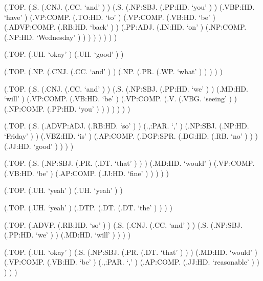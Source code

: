 \documentclass[10pt]{article}
\begin{document}
\begin{parsetree}  (.TOP. (.S. (.CNJ. (.CC. `and' ) ) (.S. (.NP:SBJ. (.PP:HD. `you' ) ) (.VBP:HD. `have' ) (.VP:COMP. (.TO:HD. `to' ) (.VP:COMP. (.VB:HD. `be' ) (.ADVP:COMP. (.RB:HD. `back' ) ) (.PP:ADJ. (.IN:HD. `on' ) (.NP:COMP. (.NP:HD. `Wednesday' ) ) ) ) ) ) ) ) \end{parsetree}

\begin{parsetree}  (.TOP. (.UH. `okay' ) (.UH. `good' ) ) \end{parsetree}

\begin{parsetree}  (.TOP. (.NP. (.CNJ. (.CC. `and' ) ) (.NP. (.PR. (.WP. `what' ) ) ) ) ) \end{parsetree}

\begin{parsetree}  (.TOP. (.S. (.CNJ. (.CC. `and' ) ) (.S. (.NP:SBJ. (.PP:HD. `we' ) ) (.MD:HD. `will' ) (.VP:COMP. (.VB:HD. `be' ) (.VP:COMP. (.V. (.VBG. `seeing' ) ) (.NP:COMP. (.PP:HD. `you' ) ) ) ) ) ) ) \end{parsetree}

\begin{parsetree}  (.TOP. (.S. (.ADVP:ADJ. (.RB:HD. `so' ) ) (.,:PAR. `,' ) (.NP:SBJ. (.NP:HD. `Friday' ) ) (.VBZ:HD. `is' ) (.AP:COMP. (.DGP:SPR. (.DG:HD. (.RB. `no' ) ) ) (.JJ:HD. `good' ) ) ) ) \end{parsetree}

\begin{parsetree}  (.TOP. (.S. (.NP:SBJ. (.PR. (.DT. `that' ) ) ) (.MD:HD. `would' ) (.VP:COMP. (.VB:HD. `be' ) (.AP:COMP. (.JJ:HD. `fine' ) ) ) ) ) \end{parsetree}

\begin{parsetree}  (.TOP. (.UH. `yeah' ) (.UH. `yeah' ) ) \end{parsetree}

\begin{parsetree}  (.TOP. (.UH. `yeah' ) (.DTP. (.DT. (.DT. `the' ) ) ) ) \end{parsetree}

\begin{parsetree}  (.TOP. (.ADVP. (.RB:HD. `so' ) ) (.S. (.CNJ. (.CC. `and' ) ) (.S. (.NP:SBJ. (.PP:HD. `we' ) ) (.MD:HD. `will' ) ) ) ) \end{parsetree}

\begin{parsetree}  (.TOP. (.UH. `okay' ) (.S. (.NP:SBJ. (.PR. (.DT. `that' ) ) ) (.MD:HD. `would' ) (.VP:COMP. (.VB:HD. `be' ) (.,:PAR. `,' ) (.AP:COMP. (.JJ:HD. `reasonable' ) ) ) ) ) \end{parsetree}
\end{document}
